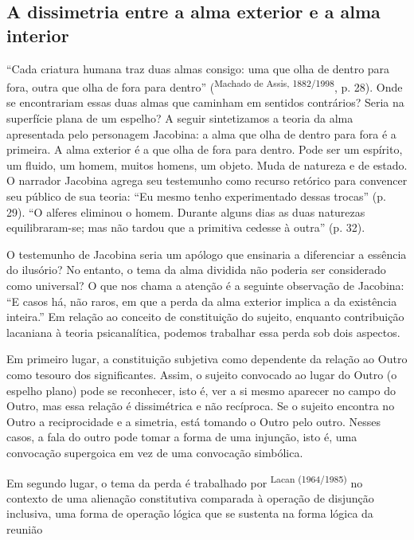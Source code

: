 \begin{multicols}{2}
\section*{A dissimetria entre a alma exterior e a alma interior}
\par{}“Cada criatura humana traz duas almas consigo:\allowbreak{} uma que olha de dentro para fora,\allowbreak{} outra que olha de fora para dentro” (\allowbreak{}\textsuperscript{Machado de Assis,\allowbreak{} 1882\fshyp{}1998},\allowbreak{} p.\allowbreak{} 28)\allowbreak{}.\allowbreak{} Onde se encontrariam essas duas almas que caminham em sentidos contrários? Seria na superfície plana de um espelho? A seguir sintetizamos a teoria da alma apresentada pelo personagem Jacobina:\allowbreak{} a alma que olha de dentro para fora é a primeira.\allowbreak{} A alma exterior é a que olha de fora para dentro.\allowbreak{} Pode ser um espírito,\allowbreak{} um fluido,\allowbreak{} um homem,\allowbreak{} muitos homens,\allowbreak{} um objeto.\allowbreak{} Muda de natureza e de estado.\allowbreak{} O narrador Jacobina agrega seu testemunho como recurso retórico para convencer seu público de sua teoria:\allowbreak{} “Eu mesmo tenho experimentado dessas trocas” (\allowbreak{}p.\allowbreak{} 29)\allowbreak{}.\allowbreak{} “O alferes eliminou o homem.\allowbreak{} Durante alguns dias as duas naturezas equilibraram-\allowbreak{}se; mas não tardou que a primitiva cedesse à outra” (\allowbreak{}p.\allowbreak{} 32)\allowbreak{}.\allowbreak{}\par{}O testemunho de Jacobina seria um apólogo que ensinaria a diferenciar a essência do ilusório? No entanto,\allowbreak{} o tema da alma dividida não poderia ser considerado como universal? O que nos chama a atenção é a seguinte observação de Jacobina:\allowbreak{} “E casos há,\allowbreak{} não raros,\allowbreak{} em que a perda da alma exterior implica a da existência inteira.\allowbreak{}” Em relação ao conceito de constituição do sujeito,\allowbreak{} enquanto contribuição lacaniana à teoria psicanalítica,\allowbreak{} podemos trabalhar essa perda sob dois aspectos.\allowbreak{}\par{}Em primeiro lugar,\allowbreak{} a constituição subjetiva como dependente da relação ao Outro como tesouro dos significantes.\allowbreak{} Assim,\allowbreak{} o sujeito convocado ao lugar do Outro (\allowbreak{}o espelho plano)\allowbreak{} pode se reconhecer,\allowbreak{} isto é,\allowbreak{} ver a si mesmo aparecer no campo do Outro,\allowbreak{} mas essa relação é dissimétrica e não recíproca.\allowbreak{} Se o sujeito encontra no Outro a reciprocidade e a simetria,\allowbreak{} está tomando o Outro pelo outro.\allowbreak{} Nesses casos,\allowbreak{} a fala do outro pode tomar a forma de uma injunção,\allowbreak{} isto é,\allowbreak{} uma convocação supergoica em vez de uma convocação simbólica.\allowbreak{}\par{}Em segundo lugar,\allowbreak{} o tema da perda é trabalhado por \textsuperscript{Lacan (\allowbreak{}1964\fshyp{}1985)\allowbreak{}} no contexto de uma alienação constitutiva comparada à operação de disjunção inclusiva,\allowbreak{} uma forma de operação lógica que se sustenta na forma lógica da reunião 
\end{multicols}
